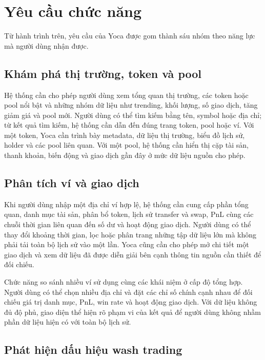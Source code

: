 \section{Yêu cầu chức năng}
\label{sec:functional_requirements}

Từ hành trình trên, yêu cầu của Yoca được gom thành sáu nhóm theo năng lực mà người dùng nhận được.

\subsection{Khám phá thị trường, token và pool}

Hệ thống cần cho phép người dùng xem tổng quan thị trường, các token hoặc pool nổi bật và những nhóm dữ liệu như trending, khối lượng, số giao dịch, tăng giảm giá và pool mới. Người dùng có thể tìm kiếm bằng tên, symbol hoặc địa chỉ; từ kết quả tìm kiếm, hệ thống cần dẫn đến đúng trang token, pool hoặc ví. Với một token, Yoca cần trình bày metadata, dữ liệu thị trường, biểu đồ lịch sử, holder và các pool liên quan. Với một pool, hệ thống cần hiển thị cặp tài sản, thanh khoản, biến động và giao dịch gần đây ở mức dữ liệu nguồn cho phép.

\subsection{Phân tích ví và giao dịch}

Khi người dùng nhập một địa chỉ ví hợp lệ, hệ thống cần cung cấp phần tổng quan, danh mục tài sản, phân bổ token, lịch sử transfer và swap, PnL cùng các chuỗi thời gian liên quan đến số dư và hoạt động giao dịch. Người dùng có thể thay đổi khoảng thời gian, lọc hoặc phân trang những tập dữ liệu lớn mà không phải tải toàn bộ lịch sử vào một lần. Yoca cũng cần cho phép mở chi tiết một giao dịch và xem dữ liệu đã được diễn giải bên cạnh thông tin nguồn cần thiết để đối chiếu.

Chức năng so sánh nhiều ví sử dụng cùng các khái niệm ở cấp độ tổng hợp. Người dùng có thể chọn nhiều địa chỉ và đặt các chỉ số chính cạnh nhau để đối chiếu giá trị danh mục, PnL, win rate và hoạt động giao dịch. Với dữ liệu không đủ độ phủ, giao diện thể hiện rõ phạm vi của kết quả để người dùng không nhầm phần dữ liệu hiện có với toàn bộ lịch sử.

\subsection{Phát hiện dấu hiệu wash trading}

